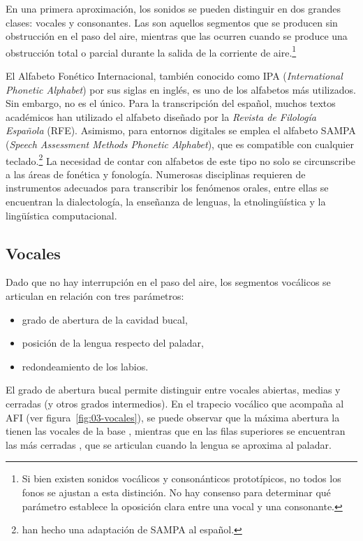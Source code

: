 En una primera aproximación, los sonidos se pueden distinguir en dos grandes
clases: vocales y consonantes. Las  son aquellos segmentos que
se producen sin obstrucción en el paso del aire, mientras que las
 ocurren cuando se produce una obstrucción total o parcial
durante la salida de la corriente de aire.\footnote{Si bien existen sonidos
vocálicos y consonánticos prototípicos, no todos los fonos se ajustan a esta
distinción. No hay consenso para determinar qué parámetro establece la oposición
clara entre una vocal y una consonante.}

\begin{recuadro}
El Alfabeto Fonético Internacional, también conocido como IPA (\textit{International
Phonetic Alphabet}) por sus siglas en inglés, es uno de los alfabetos más
utilizados. Sin embargo, no es el único. Para la transcripción del español,
muchos textos académicos han utilizado el alfabeto diseñado por la
\textit{Revista de Filología Española} (RFE). Asimismo, para entornos digitales
se emplea el alfabeto SAMPA (\textit{Speech Assessment Methods Phonetic
Alphabet}), que es compatible con cualquier teclado.\footnote{\textcite{gurlekian2001}
han hecho una adaptación de SAMPA al español.} La necesidad de contar con
alfabetos de este tipo no solo se circunscribe a las áreas de fonética y
fonología. Numerosas disciplinas requieren de instrumentos adecuados para
transcribir los fenómenos orales, entre ellas se encuentran la dialectología, la
enseñanza de lenguas, la etnolingüística y la lingüística computacional.
\end{recuadro}

\subsection{Vocales}

Dado que no hay interrupción en el paso del aire, los segmentos vocálicos se
articulan en relación con tres parámetros:

\begin{itemize}
  \item grado de abertura de la cavidad bucal,
  \item posición de la lengua respecto del paladar,
  \item redondeamiento de los labios.
\end{itemize}

El grado de abertura bucal permite distinguir entre vocales abiertas, medias y
cerradas (y otros grados intermedios). En el trapecio vocálico que acompaña al
AFI (ver figura~\ref{fig:03-vocales}), se puede observar que la máxima abertura
la tienen las vocales de la base , mientras que en las filas
superiores se encuentran las más cerradas , que se
articulan cuando la lengua se aproxima al paladar.

